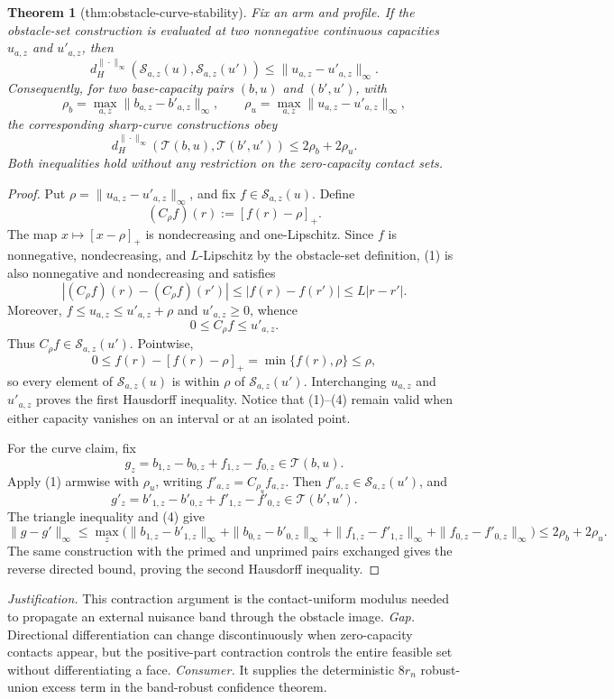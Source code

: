 \documentclass{article}
\newtheorem{theorem}{Theorem}
\begin{document}
\begin{theorem}[thm:obstacle-curve-stability]\label{thm:obstacle-curve-stability}
Fix an arm and profile.  If the obstacle-set construction is evaluated at two nonnegative continuous capacities \(u_{a,z}\) and \(u'_{a,z}\), then
\[
d_H^{\|\cdot\|_\infty}\!\left(\mathcal S_{a,z}(u),\mathcal S_{a,z}(u')\right)
\leq \|u_{a,z}-u'_{a,z}\|_\infty.
\]
Consequently, for two base-capacity pairs \((b,u)\) and \((b',u')\), with
\[
\rho_b=\max_{a,z}\|b_{a,z}-b'_{a,z}\|_\infty,
\qquad
\rho_u=\max_{a,z}\|u_{a,z}-u'_{a,z}\|_\infty,
\]
the corresponding sharp-curve constructions obey
\[
d_H^{\|\cdot\|_\infty}\!\left(\mathcal T(b,u),\mathcal T(b',u')\right)
\leq 2\rho_b+2\rho_u.
\]
Both inequalities hold without any restriction on the zero-capacity contact sets.
\end{theorem}
\begin{proof}
Put \(\rho=\|u_{a,z}-u'_{a,z}\|_\infty\), and fix \(f\in\mathcal S_{a,z}(u)\).  Define
\[
(C_\rho f)(r):=[f(r)-\rho]_+.
\tag{1}
\]
The map \(x\mapsto[x-\rho]_+\) is nondecreasing and one-Lipschitz.  Since \(f\) is nonnegative, nondecreasing, and \(L\)-Lipschitz by the obstacle-set definition, (1) is also nonnegative and nondecreasing and satisfies
\[
|(C_\rho f)(r)-(C_\rho f)(r')|
\leq |f(r)-f(r')|
\leq L|r-r'|.
\tag{2}
\]
Moreover, \(f\leq u_{a,z}\leq u'_{a,z}+\rho\) and \(u'_{a,z}\geq0\), whence
\[
0\leq C_\rho f\leq u'_{a,z}.
\tag{3}
\]
Thus \(C_\rho f\in\mathcal S_{a,z}(u')\).  Pointwise,
\[
0\leq f(r)-[f(r)-\rho]_+=\min\{f(r),\rho\}\leq\rho,
\tag{4}
\]
so every element of \(\mathcal S_{a,z}(u)\) is within \(\rho\) of \(\mathcal S_{a,z}(u')\).  Interchanging \(u_{a,z}\) and \(u'_{a,z}\) proves the first Hausdorff inequality.  Notice that (1)--(4) remain valid when either capacity vanishes on an interval or at an isolated point.

For the curve claim, fix
\[
g_z=b_{1,z}-b_{0,z}+f_{1,z}-f_{0,z}\in\mathcal T(b,u).
\]
Apply (1) armwise with \(\rho_u\), writing \(f'_{a,z}=C_{\rho_u}f_{a,z}\).  Then \(f'_{a,z}\in\mathcal S_{a,z}(u')\), and
\[
g'_z=b'_{1,z}-b'_{0,z}+f'_{1,z}-f'_{0,z}\in\mathcal T(b',u').
\]
The triangle inequality and (4) give
\[
\|g-g'\|_\infty
\leq \max_z\bigl(\|b_{1,z}-b'_{1,z}\|_\infty
+\|b_{0,z}-b'_{0,z}\|_\infty
+\|f_{1,z}-f'_{1,z}\|_\infty
+\|f_{0,z}-f'_{0,z}\|_\infty\bigr)
\leq2\rho_b+2\rho_u.
\tag{5}
\]
The same construction with the primed and unprimed pairs exchanged gives the reverse directed bound, proving the second Hausdorff inequality.
\end{proof}
\par\smallskip\noindent \textit{Justification.} This contraction argument is the contact-uniform modulus needed to propagate an external nuisance band through the obstacle image. \textit{Gap.} Directional differentiation can change discontinuously when zero-capacity contacts appear, but the positive-part contraction controls the entire feasible set without differentiating a face. \textit{Consumer.} It supplies the deterministic \(8r_n\) robust-union excess term in the band-robust confidence theorem.
\end{document}
